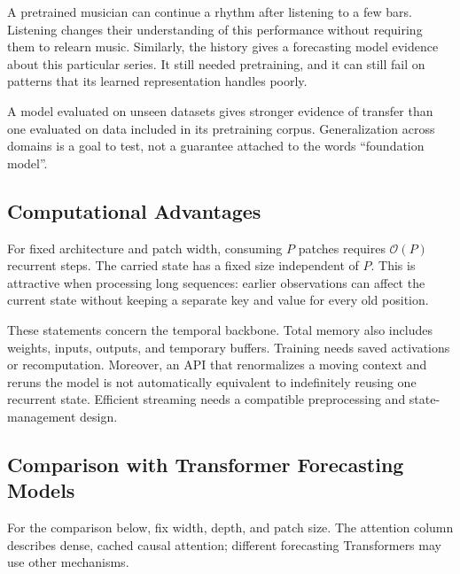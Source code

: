 \documentclass[11pt, oneside]{book}
\newcommand{\bigO}[1]{\mathcal{O}\!\left(#1\right)}
\let\originalsubsection\subsection
\renewcommand{\subsection}{\Needspace{6\baselineskip}\originalsubsection}
\begin{document}
\begin{intbox}[title={Zero-shot does not mean zero history}]
A pretrained musician can continue a rhythm after listening to a few bars. Listening changes their understanding of this performance without requiring them to relearn music. Similarly, the history gives a forecasting model evidence about this particular series. It still needed pretraining, and it can still fail on patterns that its learned representation handles poorly.
\end{intbox}

A model evaluated on unseen datasets gives stronger evidence of transfer than one evaluated on data included in its pretraining corpus. Generalization across domains is a goal to test, not a guarantee attached to the words ``foundation model''.

\subsection{Computational Advantages}\label{sec:source-9-1-5}
For fixed architecture and patch width, consuming $P$ patches requires $\bigO{P}$ recurrent steps. The carried state has a fixed size independent of $P$. This is attractive when processing long sequences: earlier observations can affect the current state without keeping a separate key and value for every old position.

These statements concern the temporal backbone. Total memory also includes weights, inputs, outputs, and temporary buffers. Training needs saved activations or recomputation. Moreover, an API that renormalizes a moving context and reruns the model is not automatically equivalent to indefinitely reusing one recurrent state. Efficient streaming needs a compatible preprocessing and state-management design.

\subsection{Comparison with Transformer Forecasting Models}\label{sec:source-9-1-6}
For the comparison below, fix width, depth, and patch size. The attention column describes dense, cached causal attention; different forecasting Transformers may use other mechanisms.
\end{document}

